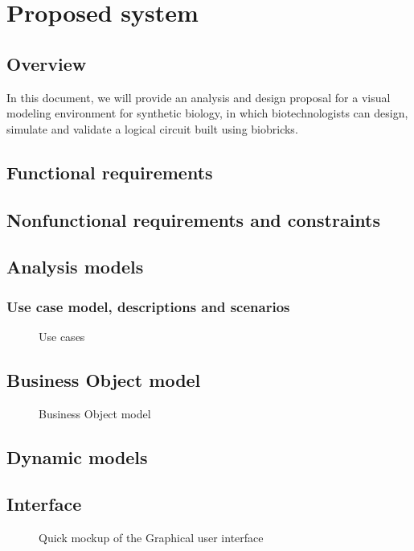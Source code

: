 \documentclass[a4paper]{article}
\begin{document}
\section{Proposed system}
\subsection{Overview} 		%
In this document, we will provide an analysis and design proposal for a visual modeling environment for synthetic biology, in which biotechnologists can design, simulate and validate a logical circuit built using biobricks.

\subsection{Functional requirements} %
\subsection{Nonfunctional requirements and constraints} %
\subsection{Analysis models}
\subsubsection{Use case model, descriptions and scenarios}
\begin{figure}[h!]
	\caption{Use cases}
	\begin{center}
	
	\end{center}
\end{figure}
\subsection{Business Object model} %
\begin{figure}[h!]
	\caption{Business Object model}
	\begin{center}
		
	\end{center}
\end{figure}

\subsection{Dynamic models}
\subsection{Interface} %
\begin{figure}[h!]
	\caption{Quick mockup of the Graphical user interface}
	\begin{center}
	\end{center}
\end{figure}
\end{document}
